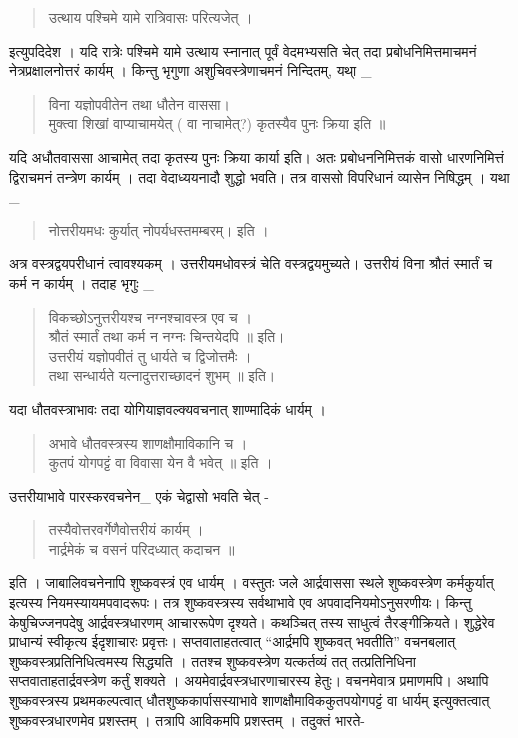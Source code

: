 \begin{verse}
उत्थाय पश्चिमे यामे रात्रिवासः परित्यजेत्  ।
\end{verse}
इत्युपदिदेश । यदि रात्रेः पश्चिमे यामे उत्थाय स्नानात् पूर्वं वेदमभ्यसति चेत् तदा प्रबोधनिमित्तमाचमनं नेत्रप्रक्षालनोत्तरं कार्यम् । किन्तु भृगुणा अशुचिवस्त्रेणाचमनं निन्दितम्, यथा् \_
\begin{verse}
विना यज्ञोपवीतेन तथा धौतेन वाससा। \\
मुक्त्वा शिखां वाप्याचामयेत् ( वा नाचामेत्?) कृतस्यैव पुनः क्रिया इति ॥ 
\end{verse}
यदि अधौतवाससा आचामेत् तदा कृतस्य पुनः क्रिया कार्या इति। अतः प्रबोधननिमित्तकं वासो धारणनिमित्तं द्विराचमनं तन्त्रेण कार्यम् । तदा वेदाध्ययनादौ शुद्धो भवति। तत्र वाससो विपरिधानं व्यासेन निषिद्धम् । यथा \_
\begin{verse}
नोत्तरीयमधः कुर्यात् नोपर्यधस्तमम्बरम्। इति । 
\end{verse}
अत्र वस्त्रद्वयपरीधानं त्वावश्यकम् । उत्तरीयमधोवस्त्रं चेति वस्त्रद्वयमुच्यते। उत्तरीयं विना श्रौतं स्मार्तं च कर्म न कार्यम् । तदाह भृगुः \_ 
\begin{verse}
विकच्छोऽनुत्तरीयश्च नग्नश्चावस्त्र एव च । \\
श्रौतं स्मार्तं तथा कर्म न नग्नः चिन्तयेदपि ॥ इति। \\
उत्तरीयं यज्ञोपवीतं तु  धार्यते च द्विजोत्तमैः । \\
तथा सन्धार्यते यत्नादुत्तराच्छादनं शुभम् ॥ इति। 
\end{verse}
यदा धौतवस्त्राभावः तदा योगियाज्ञवल्क्यवचनात् शाण्मादिकं धार्यम् । 
\begin{verse}
अभावे धौतवस्त्रस्य शाणक्षौमाविकानि च ।\\
कुतपं योगपट्टं वा विवासा येन वै भवेत् ॥ इति । 
\end{verse}
उत्तरीयाभावे पारस्करवचनेन\_ एकं चेद्वासो भवति चेत् -
\begin{verse}
तस्यैवोत्तरवर्गेणैवोत्तरीयं कार्यम् । \\
नार्द्रमेकं च वसनं परिदध्यात् कदाचन ॥ 
\end{verse}
इति । जाबालिवचनेनापि शुष्कवस्त्रं एव धार्यम् । वस्तुतः जले आर्द्रवाससा स्थले शुष्कवस्त्रेण कर्मकुर्यात् इत्यस्य नियमस्यायमपवादरूपः। तत्र शुष्कवस्त्रस्य सर्वथाभावे एव अपवादनियमोऽनुसरणीयः। किन्तु केषुचिज्जनपदेषु आर्द्रवस्त्रधारणम् आचाररूपेण दृश्यते। कथञ्चित् तस्य साधुत्वं तैरङ्गीक्रियते। शुद्धेरेव प्राधान्यं स्वीकृत्य ईदृशाचारः प्रवृत्तः। सप्तवाताहतत्वात् “आर्द्रमपि शुष्कवत् भवतीति” वचनबलात् शुष्कवस्त्रप्रतिनिधित्वमस्य सिद्ध्यति । ततश्च शुष्कवस्त्रेण यत्कर्तव्यं तत् तत्प्रतिनिधिना सप्तवाताहतार्द्रवस्त्रेण कर्तुं शक्यते । अयमेवार्द्रवस्त्रधारणाचारस्य हेतुः। वचनमेवात्र प्रमाणमपि। अथापि शुष्कवस्त्रस्य प्रथमकल्पत्वात् धौतशुष्ककार्पासस्याभावे शाणक्षौमाविककुतपयोगपट्टं वा धार्यम् इत्युक्तत्वात् शुष्कवस्त्रधारणमेव प्रशस्तम् । तत्रापि आविकमपि प्रशस्तम् । तदुक्तं भारते- 
